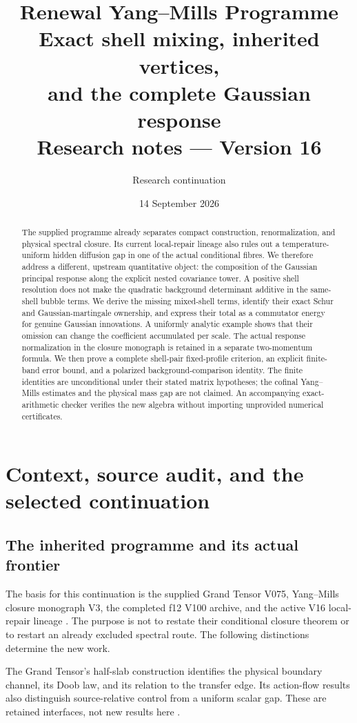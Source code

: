 \documentclass[11pt,a4paper]{article}
\title{Renewal Yang--Mills Programme\\[4pt]
Exact shell mixing, inherited vertices,\\and the complete Gaussian response\\[8pt]
\large Research notes --- Version 16}
\author{Research continuation}
\date{14 September 2026}
\theoremstyle{definition}
\theoremstyle{remark}
\newcommand{\src}[2]{\cite[#2]{#1}}
\begin{document}
\maketitle
\begin{abstract}
The supplied programme already separates compact construction,
renormalization, and physical spectral closure. Its current local-repair
lineage also rules out a temperature-uniform hidden diffusion gap in one
of the actual conditional fibres. We therefore address a different,
upstream quantitative object: the composition of the Gaussian principal
response along the explicit nested covariance tower. A positive shell
resolution does not make the quadratic background determinant additive
in the same-shell bubble terms. We derive the missing mixed-shell terms,
identify their exact Schur and Gaussian-martingale ownership, and express
their total as a commutator energy for genuine Gaussian innovations. A
uniformly analytic example shows that their omission can change the
coefficient accumulated per scale. The actual response normalization in
the closure monograph is retained in a separate two-momentum formula.
We then prove a complete shell-pair fixed-profile criterion, an explicit
finite-band error bound, and a polarized background-comparison identity.
The finite identities are unconditional under their stated matrix
hypotheses; the cofinal Yang--Mills estimates and the physical mass gap
are not claimed. An accompanying exact-arithmetic checker verifies the
new algebra without importing unprovided numerical certificates.
\end{abstract}
\tableofcontents

\section{Context, source audit, and the selected continuation}
\label{sec:v1-context}

\subsection{The inherited programme and its actual frontier}
The basis for this continuation is the supplied Grand Tensor V075,
Yang--Mills closure monograph V3, the completed f12 V100 archive, and the
active V16 local-repair lineage \cite{GT75,YM3,F12,F13}. The purpose is not
to restate their conditional closure theorem or to restart an already
excluded spectral route. The following distinctions determine the new
work.

The Grand Tensor's half-slab construction identifies the physical
boundary channel, its Doob law, and its relation to the transfer edge.
Its action-flow results also distinguish source-relative control from a
uniform scalar gap. These are retained interfaces, not new results here
\src{GT75}{\texttt{subsec:YM-half-slab-hierarchy},
\texttt{prop:YM-divergence-source-flow}}.
\end{document}
